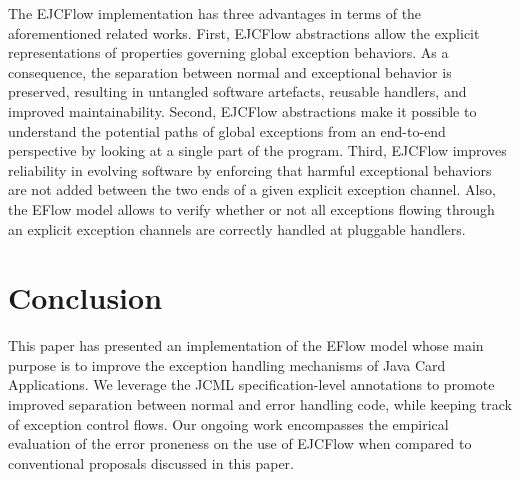 \documentclass[10pt, conference, compsocconf]{IEEEtran}
\begin{document}
The EJCFlow implementation has three advantages in terms of the aforementioned
related works. First, EJCFlow abstractions allow the explicit representations of
properties governing global exception behaviors. As a consequence, the
separation between normal and exceptional behavior is preserved, resulting in
untangled software artefacts, reusable handlers, and improved maintainability.
Second, EJCFlow abstractions make it possible to understand the potential paths
of global exceptions from an end-to-end perspective by looking at a single part
of the program. Third, EJCFlow improves reliability in evolving software by
enforcing that harmful exceptional behaviors are not added between the two ends
of a given explicit exception channel. Also, the EFlow model allows to verify
whether or not all exceptions flowing through an explicit exception channels are
correctly handled at pluggable handlers.          

 
    

\section{Conclusion} 
\label{sec:conclusion}

This paper has presented an implementation of the EFlow model whose main purpose
is to improve the exception handling mechanisms of Java Card Applications. We
leverage the JCML specification-level annotations to promote improved separation
between normal and error handling code, while keeping track of exception control
flows. Our ongoing work encompasses the empirical evaluation of the error
proneness on the use of EJCFlow when compared to conventional proposals
discussed in this paper.       







\balance


%
%
%

 





\end{document}
